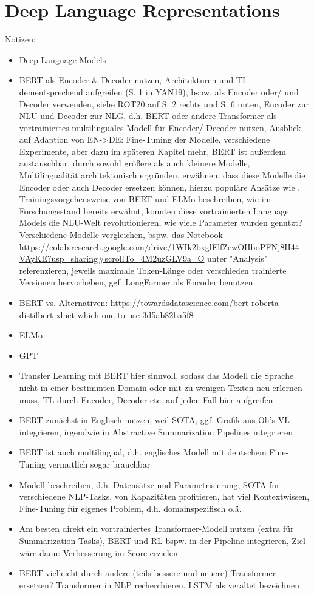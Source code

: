 \section{Deep Language Representations}
Notizen:
\begin{itemize}
	\item Deep Language Models
	\item BERT als Encoder \& Decoder nutzen, Architekturen und TL dementsprechend aufgreifen (S. 1 in YAN19), bspw. als Encoder oder/ und Decoder verwenden, siehe ROT20 auf S. 2 rechts und S. 6 unten, Encoder zur NLU und Decoder zur NLG, d.h. BERT oder andere Transformer als vortrainiertes multilinguales Modell für Encoder/ Decoder nutzen, Ausblick auf Adaption von EN->DE: Fine-Tuning der Modelle, verschiedene Experimente, aber dazu im späteren Kapitel mehr, BERT ist außerdem austauschbar, durch sowohl größere als auch kleinere Modelle, Multilingualität architektonisch ergründen, erwähnen, dass diese Modelle die Encoder oder auch Decoder ersetzen können, hierzu populäre Ansätze wie \cite{ROT20}, Trainingsvorgehensweise von BERT und ELMo beschreiben, wie im Forschungsstand bereits erwähnt, konnten diese vortrainierten Language Models die NLU-Welt revolutionieren, wie viele Parameter wurden genutzt? Verschiedene Modelle vergleichen, bspw. das Notebook \url{https://colab.research.google.com/drive/1WIk2bxglElfZewOHboPFNj8H44_VAyKE?usp=sharing#scrollTo=4M2uzGLV9a_O} unter "Analysis" referenzieren, jeweils maximale Token-Länge oder verschieden trainierte Versionen hervorheben, ggf. LongFormer als Encoder benutzen
	\item BERT vs. Alternativen: \url{https://towardsdatascience.com/bert-roberta-distilbert-xlnet-which-one-to-use-3d5ab82ba5f8}
	\item ELMo
	\item GPT
	\item Transfer Learning mit BERT hier sinnvoll, sodass das Modell die Sprache nicht in einer bestimmten Domain oder mit zu wenigen Texten neu erlernen muss, TL durch Encoder, Decoder etc. auf jeden Fall hier aufgreifen
	\item BERT zunächst in Englisch nutzen, weil SOTA, ggf. Grafik aus Oli's VL integrieren, irgendwie in Abstractive Summarization Pipelines integrieren
	\item BERT ist auch multilingual, d.h. englisches Modell mit deutschem Fine-Tuning vermutlich sogar brauchbar
	\item Modell beschreiben, d.h. Datensätze und Parametrisierung, SOTA für verschiedene NLP-Tasks, von Kapazitäten profitieren, hat viel Kontextwissen, Fine-Tuning für eigenes Problem, d.h. domainspezifisch o.ä.
	\item Am besten direkt ein vortrainiertes Transformer-Modell nutzen (extra für Summarization-Tasks), BERT und RL bspw. in der Pipeline integrieren, Ziel wäre dann: Verbesserung im Score erzielen
	\item BERT vielleicht durch andere (teils bessere und neuere) Transformer ersetzen? Transformer in NLP recherchieren, LSTM als veraltet bezeichnen
\end{itemize}

